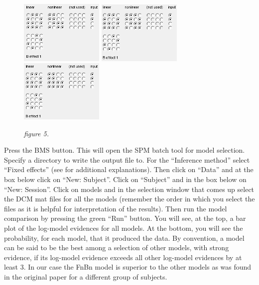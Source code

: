 \begin{figure}
\begin{center}
\includegraphics[width=40mm]{dcm_ir/figures/figure5_FlBl}
\includegraphics[width=40mm]{dcm_ir/figures/figure5_FlBn}
\includegraphics[width=40mm]{dcm_ir/figures/figure5_FnBl}
\caption{\em  figure 5. \label{dcm-ir:fig:5}}
\end{center}
\end{figure}

Press the \textsc{BMS} button. This will open the SPM batch tool for model selection. Specify a directory to write the output file to.  For the ``Inference method'' select ``Fixed effects'' (see \cite{klaas_bms} for additional explanations). Then click on ``Data'' and at the box below click on ``New: Subject''. Click on ``Subject'' and in the box below on ``New: Session''. Click on models and in the selection window that comes up select the DCM mat files for all the models (remember the order in which you select the files as it is helpful for interpretation of the results). Then run the model comparison by pressing the green ``Run'' button. You will see, at the top, a bar plot of the log-model evidences for all models. At the bottom, you will see the probability, for each model, that it produced the data. By convention, a model can be said to be the best among a selection of other models, with strong evidence, if its log-model evidence exceeds all other log-model evidences by at least 3. In our case the FnBn model is superior to the other models as was found in the original paper \cite{cc_asymm} for a different group of subjects. 

